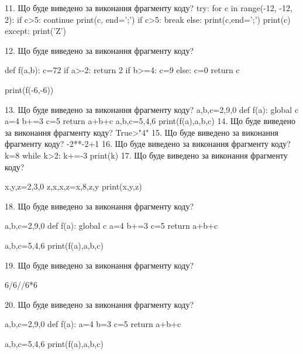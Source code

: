 \documentclass[11pt]{article}
\begin{document}
11. Що буде виведено за виконання фрагменту коду?
try:
    for c in range(-12, -12, 2):
        if c>5:
            continue
        print(c, end=';')
        if c>5:
            break
    else:
        print(c,end=';')
    print(c)
except:
    print('Z')

12. Що буде виведено за виконання фрагменту коду?

def f(a,b):
    c=72
    if a>-2:
        return 2
    if b>=4:
         c=9
    else: 
        c=0
    return c

print(f(-6,-6))

13. Що буде виведено за виконання фрагменту коду?
a,b,c=2,9,0
   def f(a):
     global c     a=4
     b+=3
     c=5
     return a+b+c
   a,b,c=5,4,6
   print(f(a),a,b,c)
14. Що буде виведено за виконання фрагменту коду?
True>"4"
15. Що буде виведено за виконання фрагменту коду?
-2**-2+1
16. Що буде виведено за виконання фрагменту коду?
k=8
   while k>2: k+=-3
   print(k)
17. Що буде виведено за виконання фрагменту коду?

x,y,z=2,3,0
z,x,x,z=x,8,z,y
print(x,y,z)

18. Що буде виведено за виконання фрагменту коду?

a,b,c=2,9,0
def f(a):
global c    a=4
    b+=3
    c=5
    return a+b+c

a,b,c=5,4,6
print(f(a),a,b,c)

19. Що буде виведено за виконання фрагменту коду?

6/6//6*6

20. Що буде виведено за виконання фрагменту коду?

a,b,c=2,9,0
def f(a):
    a=4
    b=3
    c=5
    return a+b+c

a,b,c=5,4,6
print(f(a),a,b,c)





















\newpage
\end{document}
